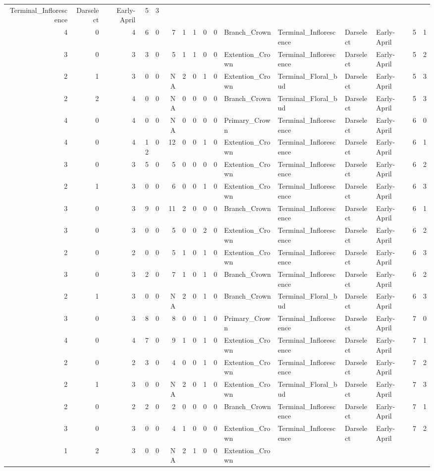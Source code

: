 \documentclass[]{article}
\begin{document}
\begin{longtable}[]{@{}rrrrrrrrrrllllrl@{}}
Terminal\_Inflorescence & Darselect & Early-April & 5 & 3\tabularnewline
4 & 0 & 4 & 6 & 0 & 7 & 1 & 1 & 0 & 0 & Branch\_Crown &
Terminal\_Inflorescence & Darselect & Early-April & 5 & 1\tabularnewline
3 & 0 & 3 & 3 & 0 & 5 & 1 & 1 & 0 & 0 & Extention\_Crown &
Terminal\_Inflorescence & Darselect & Early-April & 5 & 2\tabularnewline
2 & 1 & 3 & 0 & 0 & NA & 2 & 0 & 1 & 0 & Extention\_Crown &
Terminal\_Floral\_bud & Darselect & Early-April & 5 & 3\tabularnewline
2 & 2 & 4 & 0 & 0 & NA & 0 & 0 & 0 & 0 & Branch\_Crown &
Terminal\_Floral\_bud & Darselect & Early-April & 5 & 3\tabularnewline
4 & 0 & 4 & 0 & 0 & NA & 0 & 0 & 0 & 0 & Primary\_Crown &
Terminal\_Inflorescence & Darselect & Early-April & 6 & 0\tabularnewline
4 & 0 & 4 & 12 & 0 & 12 & 0 & 0 & 1 & 0 & Extention\_Crown &
Terminal\_Inflorescence & Darselect & Early-April & 6 & 1\tabularnewline
3 & 0 & 3 & 5 & 0 & 5 & 0 & 0 & 0 & 0 & Extention\_Crown &
Terminal\_Inflorescence & Darselect & Early-April & 6 & 2\tabularnewline
2 & 1 & 3 & 0 & 0 & 6 & 0 & 0 & 1 & 0 & Extention\_Crown &
Terminal\_Inflorescence & Darselect & Early-April & 6 & 3\tabularnewline
3 & 0 & 3 & 9 & 0 & 11 & 2 & 0 & 0 & 0 & Branch\_Crown &
Terminal\_Inflorescence & Darselect & Early-April & 6 & 1\tabularnewline
3 & 0 & 3 & 0 & 0 & 5 & 0 & 0 & 2 & 0 & Extention\_Crown &
Terminal\_Inflorescence & Darselect & Early-April & 6 & 2\tabularnewline
2 & 0 & 2 & 0 & 0 & 5 & 1 & 0 & 1 & 0 & Extention\_Crown &
Terminal\_Inflorescence & Darselect & Early-April & 6 & 3\tabularnewline
3 & 0 & 3 & 2 & 0 & 7 & 1 & 0 & 1 & 0 & Branch\_Crown &
Terminal\_Inflorescence & Darselect & Early-April & 6 & 2\tabularnewline
2 & 1 & 3 & 0 & 0 & NA & 2 & 0 & 1 & 0 & Branch\_Crown &
Terminal\_Floral\_bud & Darselect & Early-April & 6 & 3\tabularnewline
3 & 0 & 3 & 8 & 0 & 8 & 0 & 0 & 1 & 0 & Primary\_Crown &
Terminal\_Inflorescence & Darselect & Early-April & 7 & 0\tabularnewline
4 & 0 & 4 & 7 & 0 & 9 & 1 & 0 & 1 & 0 & Extention\_Crown &
Terminal\_Inflorescence & Darselect & Early-April & 7 & 1\tabularnewline
2 & 0 & 2 & 3 & 0 & 4 & 0 & 0 & 1 & 0 & Extention\_Crown &
Terminal\_Inflorescence & Darselect & Early-April & 7 & 2\tabularnewline
2 & 1 & 3 & 0 & 0 & NA & 2 & 0 & 1 & 0 & Extention\_Crown &
Terminal\_Floral\_bud & Darselect & Early-April & 7 & 3\tabularnewline
2 & 0 & 2 & 2 & 0 & 2 & 0 & 0 & 0 & 0 & Branch\_Crown &
Terminal\_Inflorescence & Darselect & Early-April & 7 & 1\tabularnewline
3 & 0 & 3 & 0 & 0 & 4 & 1 & 0 & 0 & 0 & Extention\_Crown &
Terminal\_Inflorescence & Darselect & Early-April & 7 & 2\tabularnewline
1 & 2 & 3 & 0 & 0 & NA & 2 & 1 & 0 & 0 & Extention\_Crown &

\end{longtable}
\end{document}
